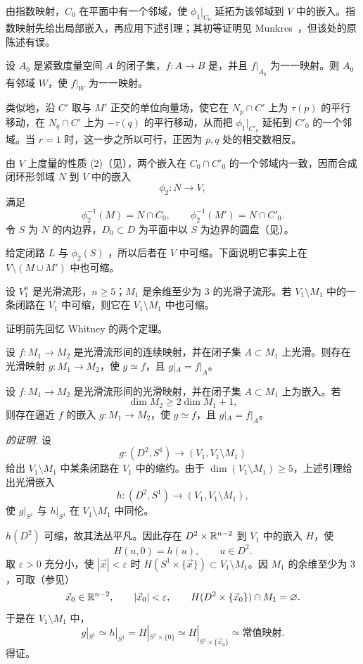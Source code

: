 由指数映射，$C_0$ 在平面中有一个邻域，使 $\phi_1|_{C_0}$ 延拓为该邻域到 $V$ 中的嵌入。指数映射先给出局部嵌入，再应用下述引理；其初等证明见 Munkres~\cite[p.~49, Lemma~5.7]{ref05}，但该处的原陈述有误。

设 $A_0$ 是紧致度量空间 $A$ 的闭子集，$f:A\to B$ 是，并且 $f|_{A_0}$ 为一一映射。则 $A_0$ 有邻域 $W$，使 $f|_W$ 为一一映射。

类似地，沿 $C'$ 取与 $M'$ 正交的单位向量场，使它在 $N_p\cap C'$ 上为 $\tau(p)$ 的平行移动，在 $N_q\cap C'$ 上为 $-\tau(q)$ 的平行移动，从而把 $\phi_1|_{C'_0}$ 延拓到 $C'_0$ 的一个邻域。当 $r=1$ 时，这一步之所以可行，正因为 $p,q$ 处的相交数相反。

由 $V$ 上度量的性质 (2)（见），两个嵌入在 $C_0\cap C'_0$ 的一个邻域内一致，因而合成闭环形邻域 $N$ 到 $V$ 中的嵌入
\[
  \phi_2:N\longrightarrow V,
\]
满足
\[
  \phi_2^{-1}(M)=N\cap C_0,
  \qquad
  \phi_2^{-1}(M')=N\cap C'_0.
\]
令 $S$ 为 $N$ 的内边界，$D_0\subset D$ 为平面中以 $S$ 为边界的圆盘（见）。

给定闭路 $L$ 与 $\phi_2(S)$ ，所以后者在 $V$ 中可缩。下面说明它事实上在 $V\setminus(M\cup M')$ 中也可缩。

设 $V_1^n$ 是光滑流形，$n\geq5$；$M_1$ 是余维至少为 $3$ 的光滑子流形。若 $V_1\setminus M_1$ 中的一条闭路在 $V_1$ 中可缩，则它在 $V_1\setminus M_1$ 中也可缩。

证明前先回忆 Whitney 的两个定理。

设 $f:M_1\to M_2$ 是光滑流形间的连续映射，并在闭子集 $A\subset M_1$ 上光滑。则存在光滑映射 $g:M_1\to M_2$，使 $g\simeq f$，且 $g|_A=f|_A$。

设 $f:M_1\to M_2$ 是光滑流形间的光滑映射，并在闭子集 $A\subset M_1$ 上为嵌入。若
\[
  \dim M_2\geq2\dim M_1+1,
\]
则存在逼近 $f$ 的嵌入 $g:M_1\to M_2$，使 $g\simeq f$，且 $g|_A=f|_A$。

\par\medskip\noindent\textit{ 的证明.}\quad
设
\[
  g:(D^2,S^1)\longrightarrow(V_1,V_1\setminus M_1)
\]
给出 $V_1\setminus M_1$ 中某条闭路在 $V_1$ 中的缩约。由于
$\dim(V_1\setminus M_1)\geq5$，上述引理给出光滑嵌入
\[
  h:(D^2,S^1)\longrightarrow(V_1,V_1\setminus M_1),
\]
使 $g|_{S^1}$ 与 $h|_{S^1}$ 在 $V_1\setminus M_1$ 中同伦。

$h(D^2)$ 可缩，故其法丛平凡。因此存在 $D^2\times\mathbb{R}^{n-2}$ 到 $V_1$ 中的嵌入 $H$，使
\[
  H(u,0)=h(u),\qquad u\in D^2.
\]
取 $\varepsilon>0$ 充分小，使 $|\vec x|<\varepsilon$ 时
$H(S^1\times\{\vec x\})\subset V_1\setminus M_1$。因 $M_1$ 的余维至少为 $3$，可取（参见）
\[
  \vec x_0\in\mathbb{R}^{n-2},
  \qquad |\vec x_0|<\varepsilon,
  \qquad H(D^2\times\{\vec x_0\})\cap M_1=\varnothing.
\]
于是在 $V_1\setminus M_1$ 中，
\[
  g|_{S^1}\simeq h|_{S^1}
  =H|_{S^1\times\{0\}}
  \simeq H|_{S^1\times\{\vec x_0\}}
  \simeq\text{常值映射}.
\]
 得证。
\EndProof

